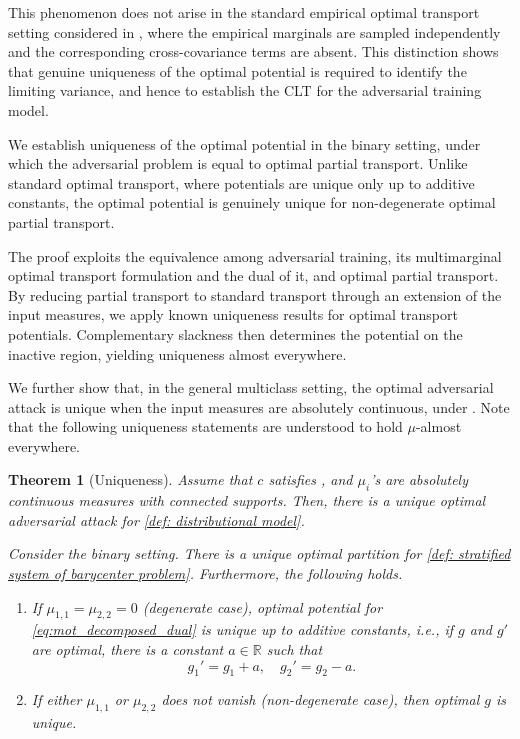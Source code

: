 \documentclass{amsart}
\theoremstyle{plain}
\numberwithin{equation}{section}\newtheorem{theorem}{Theorem}[section]
\theoremstyle{remark}
\begin{document}
This phenomenon does not arise in the standard empirical optimal transport setting considered in \cite{Tameling_etc2019, CLT_OT2019, Goldfeld_Kato_Rioux_Sadhu2024, limit_pWasserstein2024, CLT_semidiscrete_OT2024, CLT_general_transport2024, Hundrieser_etc2024, rodriguezvitores2025improvedcentrallimittheorem, delbarrio2025distributionallimittheoryoptimal}, where the empirical marginals are sampled independently and the corresponding cross-covariance terms are absent. This distinction shows that genuine uniqueness of the optimal potential is required to identify the limiting variance, and hence to establish the CLT for the adversarial training model.






We establish uniqueness of the optimal potential in the binary setting, under which the adversarial problem is equal to optimal partial transport. Unlike standard optimal transport, where potentials are unique only up to additive constants, the optimal potential is genuinely unique for non-degenerate optimal partial transport.


The proof exploits the equivalence among adversarial training, its multimarginal optimal transport formulation and the dual of it, and optimal partial transport. By reducing partial transport to standard transport through an extension of the input measures, we apply known uniqueness results for optimal transport potentials. Complementary slackness then determines the potential on the inactive region, yielding uniqueness almost everywhere.


We further show that, in the general multiclass setting, the optimal adversarial attack is unique when the input measures are absolutely continuous, under . Note that the following uniqueness statements are understood to hold $\mu$-almost everywhere.



\begin{theorem}[Uniqueness]\label{thm: uniqueness}
Assume that $c$ satisfies , and $\mu_i$'s are absolutely continuous measures with connected supports. Then, there is a unique optimal adversarial attack for \eqref{def: distributional model}.  



Consider the binary setting. There is a unique optimal partition for \eqref{def: stratified system of barycenter problem}. Furthermore, the following holds.
\begin{enumerate}
    \item[(i)] If $\mu_{1,1}=\mu_{2,2}=0$ (degenerate case), optimal potential for \eqref{eq:mot_decomposed_dual} is unique up to additive constants, i.e., if $g$ and $g'$ are optimal, there is a constant $a \in \mathbb{R}$ such that
\[
    g_1' = g_1 + a, \quad g_2'=g_2 - a.
\]
    \item[(ii)] If either $\mu_{1,1}$ or $\mu_{2,2}$ does not vanish (non-degenerate case), then optimal $g$ is unique.
\end{enumerate}    
\end{theorem}
\end{document}
